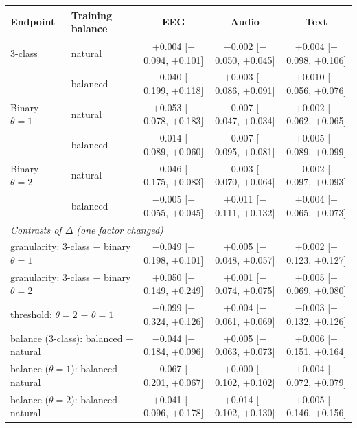 \begin{tabular}{llccc}
\toprule
\textbf{Endpoint} & \textbf{Training balance} & \textbf{EEG} & \textbf{Audio} & \textbf{Text} \\
\midrule
3-class & natural & $+$0.004 [$-$0.094, $+$0.101] & $-$0.002 [$-$0.050, $+$0.045] & $+$0.004 [$-$0.098, $+$0.106] \\
 & balanced & $-$0.040 [$-$0.199, $+$0.118] & $+$0.003 [$-$0.086, $+$0.091] & $+$0.010 [$-$0.056, $+$0.076] \\
Binary $\theta{=}1$ & natural & $+$0.053 [$-$0.078, $+$0.183] & $-$0.007 [$-$0.047, $+$0.034] & $+$0.002 [$-$0.062, $+$0.065] \\
 & balanced & $-$0.014 [$-$0.089, $+$0.060] & $-$0.007 [$-$0.095, $+$0.081] & $+$0.005 [$-$0.089, $+$0.099] \\
Binary $\theta{=}2$ & natural & $-$0.046 [$-$0.175, $+$0.083] & $-$0.003 [$-$0.070, $+$0.064] & $-$0.002 [$-$0.097, $+$0.093] \\
 & balanced & $-$0.005 [$-$0.055, $+$0.045] & $+$0.011 [$-$0.111, $+$0.132] & $+$0.004 [$-$0.065, $+$0.073] \\
\midrule
\multicolumn{5}{l}{\textit{Contrasts of $\Delta$ (one factor changed)}} \\
\multicolumn{2}{l}{granularity: 3-class $-$ binary $\theta{=}1$} & $-$0.049 [$-$0.198, $+$0.101] & $+$0.005 [$-$0.048, $+$0.057] & $+$0.002 [$-$0.123, $+$0.127] \\
\multicolumn{2}{l}{granularity: 3-class $-$ binary $\theta{=}2$} & $+$0.050 [$-$0.149, $+$0.249] & $+$0.001 [$-$0.074, $+$0.075] & $+$0.005 [$-$0.069, $+$0.080] \\
\multicolumn{2}{l}{threshold: $\theta{=}2$ $-$ $\theta{=}1$} & $-$0.099 [$-$0.324, $+$0.126] & $+$0.004 [$-$0.061, $+$0.069] & $-$0.003 [$-$0.132, $+$0.126] \\
\multicolumn{2}{l}{balance (3-class): balanced $-$ natural} & $-$0.044 [$-$0.184, $+$0.096] & $+$0.005 [$-$0.063, $+$0.073] & $+$0.006 [$-$0.151, $+$0.164] \\
\multicolumn{2}{l}{balance ($\theta{=}1$): balanced $-$ natural} & $-$0.067 [$-$0.201, $+$0.067] & $+$0.000 [$-$0.102, $+$0.102] & $+$0.004 [$-$0.072, $+$0.079] \\
\multicolumn{2}{l}{balance ($\theta{=}2$): balanced $-$ natural} & $+$0.041 [$-$0.096, $+$0.178] & $+$0.014 [$-$0.102, $+$0.130] & $+$0.005 [$-$0.146, $+$0.156] \\
\bottomrule
\end{tabular}